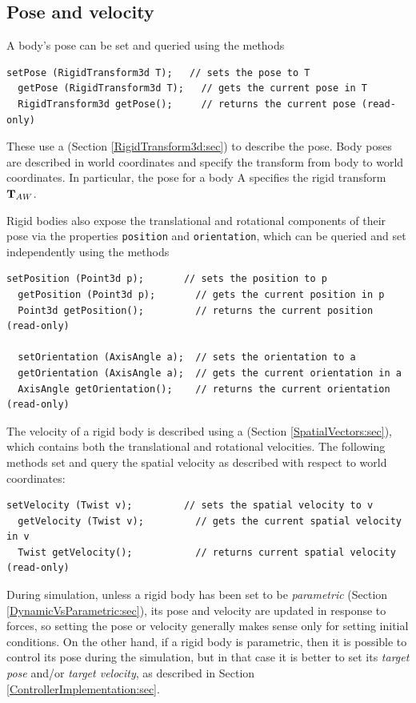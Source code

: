 \subsection{Pose and velocity}

A body's pose can be set and
queried using the methods
\begin{lstlisting}[]
  setPose (RigidTransform3d T);   // sets the pose to T
  getPose (RigidTransform3d T);   // gets the current pose in T
  RigidTransform3d getPose();     // returns the current pose (read-only)
\end{lstlisting}
%
These use a  (Section
\ref{RigidTransform3d:sec}) to describe the pose. Body poses are
described in world coordinates and specify the transform from body to
world coordinates. In particular, the pose for a body A specifies
the rigid transform ${\bf T}_{AW}$.

Rigid bodies also expose the translational and rotational components of
their pose via the properties {\tt position} and {\tt orientation},
which can be queried and set independently using the methods
\begin{lstlisting}[]
  setPosition (Point3d p);       // sets the position to p
  getPosition (Point3d p);       // gets the current position in p
  Point3d getPosition();         // returns the current position (read-only)

  setOrientation (AxisAngle a);  // sets the orientation to a
  getOrientation (AxisAngle a);  // gets the current orientation in a
  AxisAngle getOrientation();    // returns the current orientation (read-only)
\end{lstlisting}
%

The velocity of a rigid body is described using a
 (Section
\ref{SpatialVectors:sec}), which contains both the translational and
rotational velocities. The following methods
set and query the spatial velocity as described with respect to world
coordinates:
\begin{lstlisting}[]
  setVelocity (Twist v);         // sets the spatial velocity to v
  getVelocity (Twist v);         // gets the current spatial velocity in v
  Twist getVelocity();           // returns current spatial velocity (read-only)
\end{lstlisting}
%

During simulation, unless a rigid body has been set to be {\it
parametric} (Section \ref{DynamicVsParametric:sec}), its pose and
velocity are updated in response to forces, so setting the pose or
velocity generally makes sense only for setting initial conditions.
On the other hand, if a rigid body is parametric, then it is possible
to control its pose during the simulation, but in that case it is
better to set its {\it target pose} and/or {\it target velocity}, as
described in Section \ref{ControllerImplementation:sec}.


